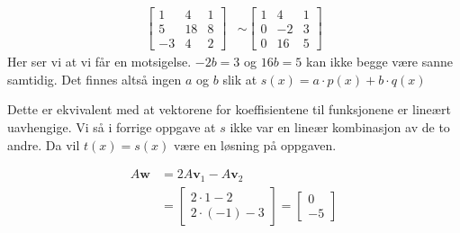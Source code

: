 \documentclass[11pt, a4paper, norsk]{NTNUoving}
\begin{document}
\begin{oppgave}
\begin{punkt}
        \begin{align*}
            \begin{bmatrix}
                1 & 4 & 1\\
                5 & 18 & 8\\
                -3 & 4 & 2
            \end{bmatrix}
            &\sim
            \begin{bmatrix}
                1 & 4 & 1\\
                0 & -2 & 3\\
                0 & 16 & 5
            \end{bmatrix}
        \end{align*}
        Her ser vi at vi får en motsigelse. $-2b=3$ og $16b=5$ kan ikke begge være sanne samtidig. Det finnes altså ingen $a$ og $b$ slik at $s(x) = a\cdot p(x) + b\cdot q(x)$
    \end{punkt}
    
    \begin{punkt}
        Dette er ekvivalent med at vektorene for koeffisientene til funksjonene er lineært uavhengige. Vi så i forrige oppgave at $s$ ikke var en lineær kombinasjon av de to andre. Da vil $t(x) = s(x)$ være en løsning på oppgaven. 
    \end{punkt}
\end{oppgave}

\begin{oppgave}[1]
        \begin{align*}
            A\textbf{w} &= 2A\textbf{v}_1-A\textbf{v}_2\\
            &=\begin{bmatrix}
                2\cdot 1-2 \\
                2\cdot (-1) - 3
            \end{bmatrix}
            =\begin{bmatrix}
                0 \\
                -5
            \end{bmatrix}
        \end{align*}
\end{oppgave}
\end{document}

